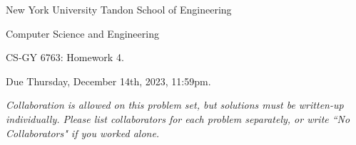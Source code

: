 \documentclass[10pt]{article}
\newcommand{\bs}[1]{\boldsymbol{#1}}
\newcommand{\bv}[1]{\mathbf{#1}}
\newcommand{\R}{\mathbb{R}}
\DeclareMathOperator*{\argmin}{arg\,min}
\DeclareMathOperator{\cut}{cut}
\begin{document}
	
\begin{center}
	\normalsize
	New York University Tandon School of Engineering
	
	Computer Science and Engineering
	\medskip
	
	\large
	CS-GY 6763: Homework 4. 
	
	Due Thursday, December 14th, 2023, 11:59pm.
	\medskip
	
	\normalsize 
	\noindent \emph{Collaboration is allowed on this problem set, but solutions must be written-up individually. Please list collaborators for each problem separately, or write ``No Collaborators" if you worked alone.}
	\medskip
\end{center} 

%
%
\end{document}
